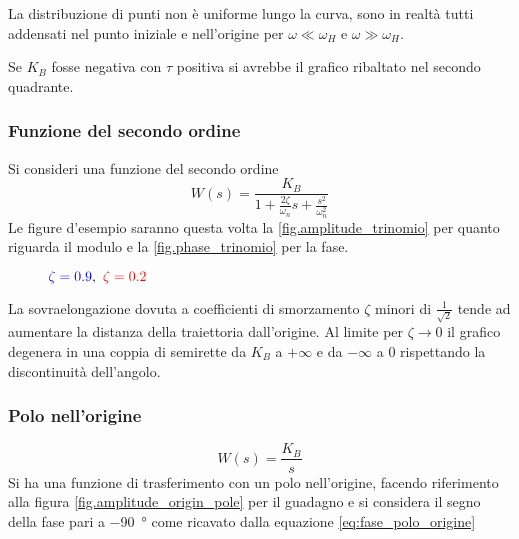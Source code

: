 La distribuzione di punti non è uniforme lungo la curva, sono in realtà tutti
addensati nel punto iniziale e nell'origine per $\omega\ll\omega_H$ e
$\omega\gg\omega_H$.

Se $K_B$ fosse negativa con $\tau$ positiva si avrebbe il grafico ribaltato nel
secondo quadrante.

\subsubsection{Funzione del secondo ordine}
Si consideri una funzione del secondo ordine
$$
W(s) = \frac{K_B}{1+\frac{2\zeta}{\omega_n}s + \frac{s^2}{\omega_n^2}}
$$
Le figure d'esempio saranno questa volta la
\ref{fig.amplitude_trinomio} per quanto riguarda il modulo e la
\ref{fig.phase_trinomio} per la fase.
\begin{figure}[h]
\centering
\def\KB{1}
\def\ZETA{0.9}
\def\ZETAA{0.2}
\caption{$\textcolor{blue}{\zeta=\ZETA},\ \textcolor{red}{\zeta=\ZETAA}$}
\end{figure}

La sovraelongazione dovuta a coefficienti di smorzamento $\zeta$ minori di
$\frac{1}{\sqrt{2}}$ tende ad aumentare la distanza della traiettoria
dall'origine.
Al limite per $\zeta\to 0 $ il grafico degenera in una coppia di semirette da
$K_B$ a $+\infty$ e da $-\infty$ a $0$ rispettando la discontinuità dell'angolo.

\newpage
\subsubsection{Polo nell'origine}
\begin{equation}
W(s) = \frac{K_B}{s}
\label{eq.polo_origine}
\end{equation}
Si ha una funzione di trasferimento con un polo nell'origine, facendo
riferimento alla figura \ref{fig.amplitude_origin_pole} per il guadagno e si
considera il segno della fase pari a \SI{-90}{\degree} come ricavato dalla
equazione \ref{eq:fase_polo_origine}


